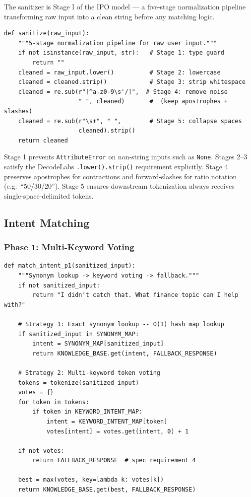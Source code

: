\documentclass[12pt, a4paper]{article}
\begin{document}
The sanitizer is Stage I of the IPO model --- a five-stage normalization
pipeline transforming raw input into a clean string before any matching logic.

\begin{lstlisting}[caption={Input sanitization pipeline --- \texttt{sanitizer.py}},
                   label={lst:sanitize}]
def sanitize(raw_input):
    """5-stage normalization pipeline for raw user input."""
    if not isinstance(raw_input, str):   # Stage 1: type guard
        return ""
    cleaned = raw_input.lower()          # Stage 2: lowercase
    cleaned = cleaned.strip()            # Stage 3: strip whitespace
    cleaned = re.sub(r"[^a-z0-9\s'/]",  # Stage 4: remove noise
                     " ", cleaned)       #  (keep apostrophes + slashes)
    cleaned = re.sub(r"\s+", " ",        # Stage 5: collapse spaces
                     cleaned).strip()
    return cleaned
\end{lstlisting}

Stage 1 prevents \texttt{AttributeError} on non-string inputs such as
\texttt{None}. Stages 2--3 satisfy the DecodeLabs \texttt{.lower().strip()}
requirement explicitly. Stage 4 preserves apostrophes for contractions and
forward-slashes for ratio notation (e.g.\ ``50/30/20''). Stage 5 ensures
downstream tokenization always receives single-space-delimited tokens.

\subsection{Intent Matching}

\subsubsection{Phase 1: Multi-Keyword Voting}

\begin{lstlisting}[caption={Phase 1 intent matcher --- \texttt{matcher.py}},
                   label={lst:p1}]
def match_intent_p1(sanitized_input):
    """Synonym lookup -> keyword voting -> fallback."""
    if not sanitized_input:
        return "I didn't catch that. What finance topic can I help with?"

    # Strategy 1: Exact synonym lookup -- O(1) hash map lookup
    if sanitized_input in SYNONYM_MAP:
        intent = SYNONYM_MAP[sanitized_input]
        return KNOWLEDGE_BASE.get(intent, FALLBACK_RESPONSE)

    # Strategy 2: Multi-keyword token voting
    tokens = tokenize(sanitized_input)
    votes = {}
    for token in tokens:
        if token in KEYWORD_INTENT_MAP:
            intent = KEYWORD_INTENT_MAP[token]
            votes[intent] = votes.get(intent, 0) + 1

    if not votes:
        return FALLBACK_RESPONSE  # spec requirement 4

    best = max(votes, key=lambda k: votes[k])
    return KNOWLEDGE_BASE.get(best, FALLBACK_RESPONSE)
\end{lstlisting}
\end{document}
